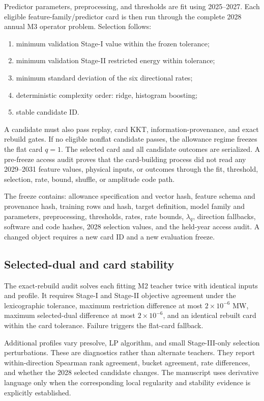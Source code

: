 \documentclass[10pt,journal,onecolumn]{IEEEtran}
\begin{document}
Predictor parameters, preprocessing, and thresholds are fit using 2025--2027.
Each eligible feature-family/predictor card is then run through the complete
2028 annual M3 operator problem. Selection follows:
\begin{enumerate}[leftmargin=*,itemsep=2pt]
\item minimum validation Stage-I value within the frozen tolerance;
\item minimum validation Stage-II restricted energy within tolerance;
\item minimum standard deviation of the six directional rates;
\item deterministic complexity order: ridge, histogram boosting;
\item stable candidate ID.
\end{enumerate}
A candidate must also pass replay, card KKT, information-provenance, and exact
rebuild gates. If no eligible nonflat candidate passes, the allowance regime
freezes the flat card $q=1$. The selected card and all candidate outcomes are
serialized. A pre-freeze access audit proves that the card-building process did
not read any 2029--2031 feature values, physical inputs, or outcomes through the
fit, threshold, selection, rate, bound, shuffle, or amplitude code path.

The freeze contains: allowance specification and vector hash, feature schema and
provenance hash, training rows and hash, target definition, model family and
parameters, preprocessing, thresholds, rates, rate bounds, $\lambda_q$,
direction fallbacks, software and code hashes, 2028 selection
values, and the held-year access audit. A changed object requires a new card ID
and a new evaluation freeze.

\subsection{Selected-dual and card stability}

The exact-rebuild audit solves each fitting M2 teacher twice with identical
inputs and profile. It requires Stage-I and Stage-II objective agreement under
the lexicographic tolerance, maximum restriction difference at most
$2\times10^{-6}$ MW, maximum selected-dual difference at most
$2\times10^{-6}$, and an identical rebuilt card within the card tolerance.
Failure triggers the flat-card fallback.

Additional profiles vary presolve, LP algorithm, and small Stage-III-only
selection perturbations. These are diagnostics rather than alternate teachers.
They report within-direction Spearman rank agreement, bucket agreement, rate
differences, and whether the 2028 selected candidate changes. The manuscript
uses derivative language only when the corresponding local regularity and
stability evidence is explicitly established.
\end{document}
